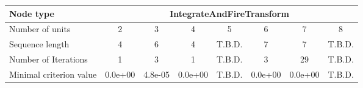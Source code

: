 \begin{tabular}{l|ccccccc|}
Node type & \multicolumn{7}{c}{IntegrateAndFireTransform} \\
\hline
Number of units & 2 & 3 & 4 & 5 & 6 & 7 & 8 \\
Sequence length & 4 & 6 & 4 &  T.B.D. & 7 & 7 &  T.B.D. \\
Number of Iterations & 1 & 3 & 1 & T.B.D. & 3 & 29 & T.B.D. \\
Minimal criterion value & 0.0e+00 & 4.8e-05 & 0.0e+00 &  T.B.D. & 0.0e+00 & 0.0e+00 &  T.B.D. \\
\hline
\end{tabular}
